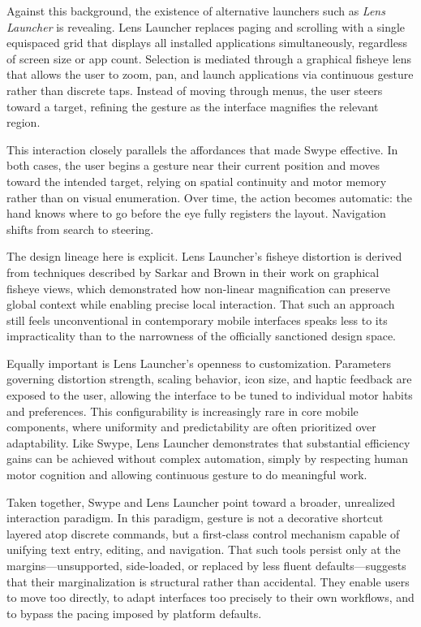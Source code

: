 \documentclass[11pt]{article}
\begin{document}
Against this background, the existence of alternative launchers such as \textit{Lens Launcher} is revealing. Lens Launcher replaces paging and scrolling with a single equispaced grid that displays all installed applications simultaneously, regardless of screen size or app count. Selection is mediated through a graphical fisheye lens that allows the user to zoom, pan, and launch applications via continuous gesture rather than discrete taps. Instead of moving through menus, the user steers toward a target, refining the gesture as the interface magnifies the relevant region.

This interaction closely parallels the affordances that made Swype effective. In both cases, the user begins a gesture near their current position and moves toward the intended target, relying on spatial continuity and motor memory rather than on visual enumeration. Over time, the action becomes automatic: the hand knows where to go before the eye fully registers the layout. Navigation shifts from search to steering.

The design lineage here is explicit. Lens Launcher’s fisheye distortion is derived from techniques described by Sarkar and Brown in their work on graphical fisheye views, which demonstrated how non-linear magnification can preserve global context while enabling precise local interaction. That such an approach still feels unconventional in contemporary mobile interfaces speaks less to its impracticality than to the narrowness of the officially sanctioned design space.

Equally important is Lens Launcher’s openness to customization. Parameters governing distortion strength, scaling behavior, icon size, and haptic feedback are exposed to the user, allowing the interface to be tuned to individual motor habits and preferences. This configurability is increasingly rare in core mobile components, where uniformity and predictability are often prioritized over adaptability. Like Swype, Lens Launcher demonstrates that substantial efficiency gains can be achieved without complex automation, simply by respecting human motor cognition and allowing continuous gesture to do meaningful work.

Taken together, Swype and Lens Launcher point toward a broader, unrealized interaction paradigm. In this paradigm, gesture is not a decorative shortcut layered atop discrete commands, but a first-class control mechanism capable of unifying text entry, editing, and navigation. That such tools persist only at the margins—unsupported, side-loaded, or replaced by less fluent defaults—suggests that their marginalization is structural rather than accidental. They enable users to move too directly, to adapt interfaces too precisely to their own workflows, and to bypass the pacing imposed by platform defaults.
\end{document}
